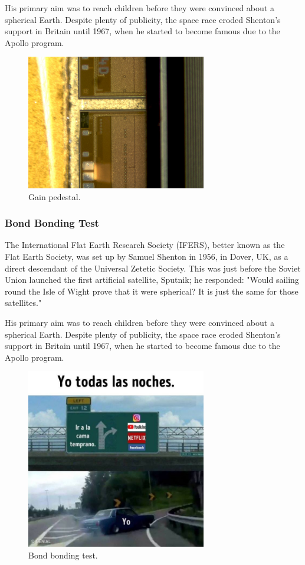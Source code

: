His primary aim was to reach children before they were convinced about a spherical Earth. Despite plenty of publicity, the space race eroded Shenton's support in Britain until 1967, when he started to become famous due to the Apollo program.
\begin{figure}[!h]
  \centering
  \includegraphics[width=0.7\textwidth]{../images/ch7/6}
  \caption[Gain Pedestal.]{Gain pedestal.}\label{fig:vis_insp}
\end{figure}

\subsubsection{Bond Bonding Test}
The International Flat Earth Research Society (IFERS), better known as the Flat Earth Society, was set up by Samuel Shenton in 1956, in Dover, UK, as a direct descendant of the Universal Zetetic Society. This was just before the Soviet Union launched the first artificial satellite, Sputnik; he responded: "Would sailing round the Isle of Wight prove that it were spherical? It is just the same for those satellites."

His primary aim was to reach children before they were convinced about a spherical Earth. Despite plenty of publicity, the space race eroded Shenton's support in Britain until 1967, when he started to become famous due to the Apollo program.
\begin{figure}[!h]
  \centering
  \includegraphics[width=0.7\textwidth]{../images/ch7/7}
  \caption[Bond bonding test.]{Bond bonding test.}\label{fig:vis_insp}
\end{figure}

